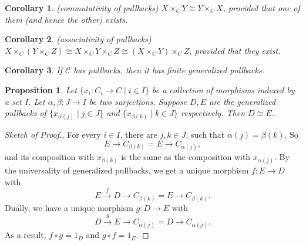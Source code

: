 \documentclass[12pt]{article}
\newtheorem{prop}{Proposition}
\newtheorem{cor}{Corollary}
\begin{document}
\begin{cor}  (commutativity of pullbacks) $X\times_C Y\cong Y\times_C X$, provided that one of them (and hence the other) exists.  \end{cor}
\begin{cor}  (associativity of pullbacks) $X\times_C (Y\times_C Z) \cong X\times_C Y \times_C Z \cong (X\times_C Y) \times_C Z$, provided that they exist.  \end{cor}
\begin{cor}  If $\mathcal{C}$ has pullbacks, then it has finite generalized pullbacks.  \end{cor}

\begin{prop} Let $\lbrace x_i: C_i\to C\mid i\in I\rbrace$ be a collection of morphisms indexed by a set $I$.  Let $\alpha,\beta:J\to I$ be two surjections.  Suppose $D,E$ are the generalized pullbacks of $\lbrace x_{\alpha(j)} \mid j\in J \rbrace$ and $\lbrace x_{\beta(k)}\mid k\in J \rbrace$ respectively.  Then $D\cong E$. \end{prop}
\begin{proof}[Sketch of Proof.]  For every $i\in I$, there are $j,k\in J$, such that $\alpha(j)=\beta(k)$.  So $$E\to C_{\beta(k)}=E\to C_{\alpha(j)},$$ and its composition with $x_{\beta(k)}$ is the same as the composition with $x_{\alpha(j)}$.  By the universality of generalized pullbacks, we get a unique morphism $f:E\to D$ with 
$$E \stackrel{f}{\longrightarrow} D \longrightarrow C_{\beta(k)} = E \to C_{\beta(k)}.$$
Dually, we have a unique morphism $g:D\to E$ with 
$$D \stackrel{g}{\longrightarrow} E \longrightarrow C_{\alpha(j)} = D \to C_{\alpha(j)}.$$
As a result, $f\circ g=1_D$ and $g\circ f=1_E$.
\end{proof}
\end{document}
